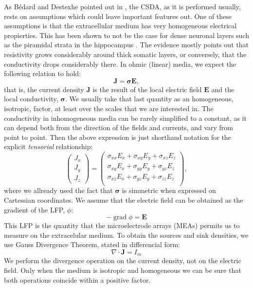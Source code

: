 \documentclass{article}
\newcommand{\Jd}{\mathbf{J}}
\newcommand{\EF}{\mathbf{E}}
\newcommand{\cond}{\boldsymbol{\sigma}}
\DeclareMathOperator{\grad}{grad}
\begin{document}
As Bédard and Destexhe pointed out in \cite{Bedard11}, the CSDA, as it
is performed usually, rests on
assumptions which could leave important features out. One of these 
assumptions is that the extracellular medium has very homogeneous 
electrical propierties. This has been shown to not be
the case for dense neuronal layers such as the piramidal
strata in the hippocampus \cite{Holsheimer87, Lopez01, TrevinoPersonal}.
The evidence mostly points out that resistivity grows 
considerably around thick somatic layers, or conversely, that
the conductivity drops considerably there. In ohmic (linear) media,
we expect the following relation to hold:
\begin{equation}
\Jd=\cond \EF,
\end{equation}
that is, the current density $\Jd$ is the result of the
local electric field $\EF$ and the local conductivity, $\cond$.
We usually take that last quantity as an homogeneous, isotropic,
factor, at least over the scales that we are interested in.
The conductivity in inhomogeneous media can be rarely
simplified to a constant, as it can depend both from the direction
of the fields and currents, and vary from point to point. 
Then the above expression is just shorthand notation for the
explicit  \emph{tensorial} relationship:
\begin{equation}
  \begin{pmatrix}
    J_x \\
    J_y \\
    J_z
  \end{pmatrix}
  =
   \begin{pmatrix}
     \sigma_{xx}E_x+ \sigma_{xy}E_y+\sigma_{xz}E_z \\
     \sigma_{xy}E_x+ \sigma_{yy}E_y+\sigma_{yz}E_z \\
     \sigma_{xz}E_x+ \sigma_{yz}E_y+\sigma_{zz}E_z \\
  \end{pmatrix},
\end{equation}
where we allready used the fact that $\cond$ is simmetric when
expressed on Cartessian coordinates.
We assume that the electric field can be obtained as the
gradient of the LFP, $\phi$:
\begin{equation}
  -\grad \phi=\EF
\end{equation}
This LFP is the quantity that the microelectrode arrays (MEAs) permits us
to measure on the extracelular medium.
To obtain the sources and sink densities, we use Gauss Divergence Theorem,
stated in differencial form:
\begin{equation}
\nabla \cdot \Jd =I_m
\end{equation}
We perform the divergence operation on the current density, not
on the electric field. Only when the medium is isotropic and homogeneous
we can be sure that both operations coincide within a positive factor.
\end{document}
